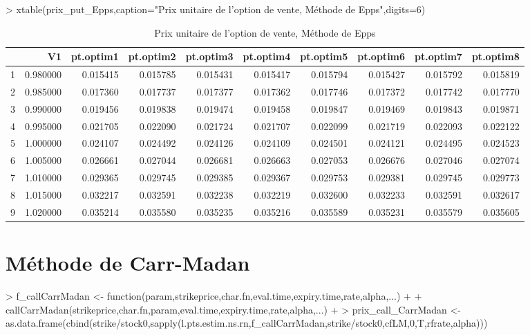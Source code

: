 \documentclass[letter]{report}
\begin{document}
\begin{Schunk}
\begin{Sinput}
> 	xtable(prix_put_Epps,caption="Prix unitaire de l'option de vente, Méthode de Epps",digits=6)
\end{Sinput}
% latex table generated in R 3.1.0 by xtable 1.7-3 package
% Tue May 27 23:05:26 2014
\begin{table}[ht]
\centering
\begin{tabular}{rrrrrrrrrr}
  \hline
 & V1 & pt.optim1 & pt.optim2 & pt.optim3 & pt.optim4 & pt.optim5 & pt.optim6 & pt.optim7 & pt.optim8 \\ 
  \hline
1 & 0.980000 & 0.015415 & 0.015785 & 0.015431 & 0.015417 & 0.015794 & 0.015427 & 0.015792 & 0.015819 \\ 
  2 & 0.985000 & 0.017360 & 0.017737 & 0.017377 & 0.017362 & 0.017746 & 0.017372 & 0.017742 & 0.017770 \\ 
  3 & 0.990000 & 0.019456 & 0.019838 & 0.019474 & 0.019458 & 0.019847 & 0.019469 & 0.019843 & 0.019871 \\ 
  4 & 0.995000 & 0.021705 & 0.022090 & 0.021724 & 0.021707 & 0.022099 & 0.021719 & 0.022093 & 0.022122 \\ 
  5 & 1.000000 & 0.024107 & 0.024492 & 0.024126 & 0.024109 & 0.024501 & 0.024121 & 0.024495 & 0.024523 \\ 
  6 & 1.005000 & 0.026661 & 0.027044 & 0.026681 & 0.026663 & 0.027053 & 0.026676 & 0.027046 & 0.027074 \\ 
  7 & 1.010000 & 0.029365 & 0.029745 & 0.029385 & 0.029367 & 0.029753 & 0.029381 & 0.029745 & 0.029773 \\ 
  8 & 1.015000 & 0.032217 & 0.032591 & 0.032238 & 0.032219 & 0.032600 & 0.032233 & 0.032591 & 0.032617 \\ 
  9 & 1.020000 & 0.035214 & 0.035580 & 0.035235 & 0.035216 & 0.035589 & 0.035231 & 0.035579 & 0.035605 \\ 
   \hline
\end{tabular}
\caption{Prix unitaire de l'option de vente, Méthode de Epps} 
\end{table}\end{Schunk}

\section{Méthode de Carr-Madan}
\begin{Schunk}
\begin{Sinput}
> 	f_callCarrMadan <- function(param,strikeprice,char.fn,eval.time,expiry.time,rate,alpha,...)
+ 	{
+ 		callCarrMadan(strikeprice,char.fn,param,eval.time,expiry.time,rate,alpha,...)
+ 	}
> 	prix_call_CarrMadan <- as.data.frame(cbind(strike/stock0,sapply(l.pts.estim.ns.rn,f_callCarrMadan,strike/stock0,cfLM,0,T,rfrate,alpha)))
\end{Sinput}
\end{Schunk}
\end{document}
